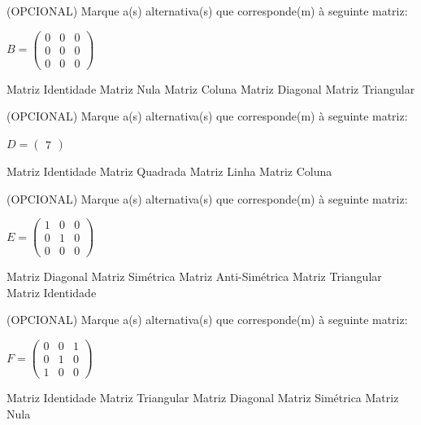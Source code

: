 \documentclass[pdftex, brazil, 12pt, oneside, addpoints]{exam}
\begin{document}
\begin{questions}
\question
(OPCIONAL) Marque a(s) alternativa(s) que corresponde(m) à seguinte matriz:

\hspace{5cm}$B = \begin{pmatrix}
  0 & 0 & 0\\
  0 & 0 & 0\\
  0 & 0 & 0
\end{pmatrix}$
\begin{checkboxes}
  \choice Matriz Identidade
  \CorrectChoice Matriz Nula
  \choice Matriz Coluna
  \CorrectChoice Matriz Diagonal
  \choice Matriz Triangular
\end{checkboxes}

\question
(OPCIONAL) Marque a(s) alternativa(s) que corresponde(m) à seguinte matriz:

\hspace{5cm}$D = \begin{pmatrix}
  7
\end{pmatrix}$
\begin{checkboxes}
  \choice Matriz Identidade
  \CorrectChoice Matriz Quadrada
  \CorrectChoice Matriz Linha
  \CorrectChoice Matriz Coluna
\end{checkboxes}

\question
(OPCIONAL) Marque a(s) alternativa(s) que corresponde(m) à seguinte matriz:

\hspace{5cm}$E = \begin{pmatrix}
  1 & 0 & 0\\
  0 & 1 & 0\\
  0 & 0 & 0
\end{pmatrix}$
\begin{checkboxes}
  \CorrectChoice Matriz Diagonal
  \CorrectChoice Matriz Simétrica
  \choice Matriz Anti-Simétrica
  \choice Matriz Triangular
  \choice Matriz Identidade
\end{checkboxes}

\question
(OPCIONAL) Marque a(s) alternativa(s) que corresponde(m) à seguinte matriz:

\hspace{5cm}$F = \begin{pmatrix}
  0 & 0 & 1\\
  0 & 1 & 0\\
  1 & 0 & 0
\end{pmatrix}$
\begin{checkboxes}
  \choice Matriz Identidade
  \choice Matriz Triangular
  \choice Matriz Diagonal
  \CorrectChoice Matriz Simétrica
  \choice Matriz Nula
\end{checkboxes}


\end{questions}
\end{document}
